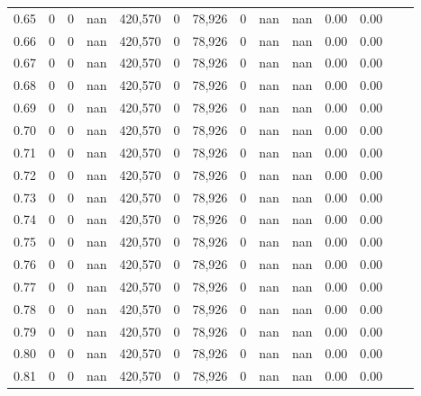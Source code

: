\begin{tabular}{rrrrrrrrrrrrrr}
0.65 &        0 &       0 &     nan &  420,570 &        0 &  78,926 &       0 &   nan &   nan &  0.00 &      0.00 \\
0.66 &        0 &       0 &     nan &  420,570 &        0 &  78,926 &       0 &   nan &   nan &  0.00 &      0.00 \\
0.67 &        0 &       0 &     nan &  420,570 &        0 &  78,926 &       0 &   nan &   nan &  0.00 &      0.00 \\
0.68 &        0 &       0 &     nan &  420,570 &        0 &  78,926 &       0 &   nan &   nan &  0.00 &      0.00 \\
0.69 &        0 &       0 &     nan &  420,570 &        0 &  78,926 &       0 &   nan &   nan &  0.00 &      0.00 \\
0.70 &        0 &       0 &     nan &  420,570 &        0 &  78,926 &       0 &   nan &   nan &  0.00 &      0.00 \\
0.71 &        0 &       0 &     nan &  420,570 &        0 &  78,926 &       0 &   nan &   nan &  0.00 &      0.00 \\
0.72 &        0 &       0 &     nan &  420,570 &        0 &  78,926 &       0 &   nan &   nan &  0.00 &      0.00 \\
0.73 &        0 &       0 &     nan &  420,570 &        0 &  78,926 &       0 &   nan &   nan &  0.00 &      0.00 \\
0.74 &        0 &       0 &     nan &  420,570 &        0 &  78,926 &       0 &   nan &   nan &  0.00 &      0.00 \\
0.75 &        0 &       0 &     nan &  420,570 &        0 &  78,926 &       0 &   nan &   nan &  0.00 &      0.00 \\
0.76 &        0 &       0 &     nan &  420,570 &        0 &  78,926 &       0 &   nan &   nan &  0.00 &      0.00 \\
0.77 &        0 &       0 &     nan &  420,570 &        0 &  78,926 &       0 &   nan &   nan &  0.00 &      0.00 \\
0.78 &        0 &       0 &     nan &  420,570 &        0 &  78,926 &       0 &   nan &   nan &  0.00 &      0.00 \\
0.79 &        0 &       0 &     nan &  420,570 &        0 &  78,926 &       0 &   nan &   nan &  0.00 &      0.00 \\
0.80 &        0 &       0 &     nan &  420,570 &        0 &  78,926 &       0 &   nan &   nan &  0.00 &      0.00 \\
0.81 &        0 &       0 &     nan &  420,570 &        0 &  78,926 &       0 &   nan &   nan &  0.00 &      0.00 \\

\end{tabular}
